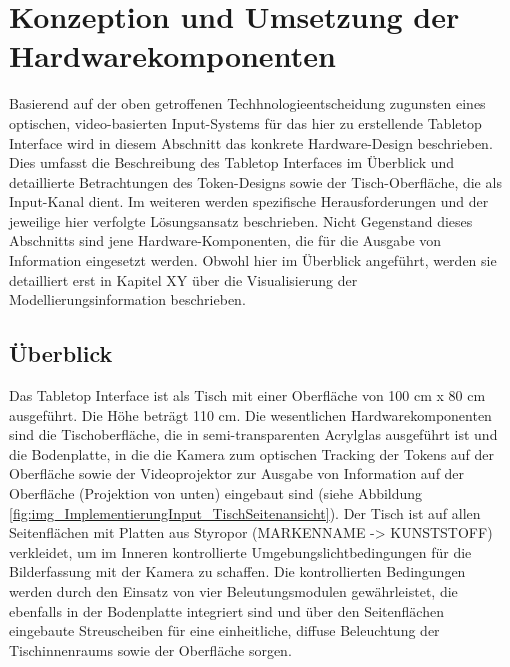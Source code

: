 

\section{Konzeption und Umsetzung der Hardwarekomponenten} %
\label{sec:konzeption_und_umsetzung_der_hardwarekomponenten}

Basierend auf der oben getroffenen Techhnologieentscheidung zugunsten eines optischen, video-basierten Input-Systems für das hier zu erstellende Tabletop Interface wird in diesem Abschnitt das konkrete Hardware-Design beschrieben. Dies umfasst die Beschreibung des Tabletop Interfaces im Überblick und detaillierte Betrachtungen des Token-Designs sowie der Tisch-Oberfläche, die als Input-Kanal dient. Im weiteren werden spezifische Herausforderungen und der jeweilige hier verfolgte Lösungsansatz beschrieben. Nicht Gegenstand dieses Abschnitts sind jene Hardware-Komponenten, die für die Ausgabe von Information eingesetzt werden. Obwohl hier im Überblick angeführt, werden sie detailliert erst in Kapitel XY über die Visualisierung der Modellierungsinformation beschrieben.

\subsection{Überblick} %
\label{sub:Überblick}

Das Tabletop Interface ist als Tisch mit einer Oberfläche von 100 cm x 80 cm ausgeführt. Die Höhe beträgt 110 cm. Die wesentlichen Hardwarekomponenten sind die Tischoberfläche, die in semi-transparenten Acrylglas ausgeführt ist und die Bodenplatte, in die die Kamera zum optischen Tracking der Tokens auf der Oberfläche sowie der Videoprojektor zur Ausgabe von Information auf der Oberfläche (Projektion von unten) eingebaut sind (siehe Abbildung \ref{fig:img_ImplementierungInput_TischSeitenansicht}). Der Tisch ist auf allen Seitenflächen mit Platten aus Styropor (MARKENNAME -> KUNSTSTOFF) verkleidet, um im Inneren kontrollierte Umgebungslichtbedingungen für die Bilderfassung mit der Kamera zu schaffen. Die kontrollierten Bedingungen werden durch den Einsatz von vier Beleutungsmodulen gewährleistet, die ebenfalls in der Bodenplatte integriert sind und über den Seitenflächen eingebaute Streuscheiben für eine einheitliche, diffuse Beleuchtung der Tischinnenraums sowie der Oberfläche sorgen.

